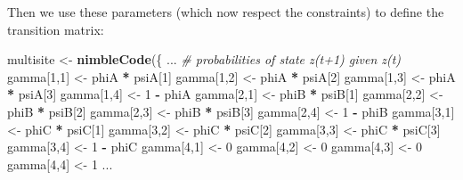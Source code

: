 \documentclass[
  12pt,
]{krantz}
\newenvironment{Shaded}{\begin{snugshade}}{\end{snugshade}}
\newcommand{\CommentTok}[1]{\textcolor[rgb]{0.56,0.35,0.01}{\textit{#1}}}
\newcommand{\DecValTok}[1]{\textcolor[rgb]{0.00,0.00,0.81}{#1}}
\newcommand{\FunctionTok}[1]{\textcolor[rgb]{0.13,0.29,0.53}{\textbf{#1}}}
\newcommand{\NormalTok}[1]{#1}
\newcommand{\OtherTok}[1]{\textcolor[rgb]{0.56,0.35,0.01}{#1}}
\newcommand{\SpecialCharTok}[1]{\textcolor[rgb]{0.81,0.36,0.00}{\textbf{#1}}}
\begin{document}
Then we use these parameters (which now respect the constraints) to define the transition matrix:

\begin{Shaded}
\begin{Highlighting}[]
\NormalTok{multisite }\OtherTok{\textless{}{-}} \FunctionTok{nimbleCode}\NormalTok{(\{}
\NormalTok{...}
  \CommentTok{\# probabilities of state z(t+1) given z(t)}
\NormalTok{  gamma[}\DecValTok{1}\NormalTok{,}\DecValTok{1}\NormalTok{] }\OtherTok{\textless{}{-}}\NormalTok{ phiA }\SpecialCharTok{*}\NormalTok{ psiA[}\DecValTok{1}\NormalTok{]}
\NormalTok{  gamma[}\DecValTok{1}\NormalTok{,}\DecValTok{2}\NormalTok{] }\OtherTok{\textless{}{-}}\NormalTok{ phiA }\SpecialCharTok{*}\NormalTok{ psiA[}\DecValTok{2}\NormalTok{]}
\NormalTok{  gamma[}\DecValTok{1}\NormalTok{,}\DecValTok{3}\NormalTok{] }\OtherTok{\textless{}{-}}\NormalTok{ phiA }\SpecialCharTok{*}\NormalTok{ psiA[}\DecValTok{3}\NormalTok{]}
\NormalTok{  gamma[}\DecValTok{1}\NormalTok{,}\DecValTok{4}\NormalTok{] }\OtherTok{\textless{}{-}} \DecValTok{1} \SpecialCharTok{{-}}\NormalTok{ phiA}
\NormalTok{  gamma[}\DecValTok{2}\NormalTok{,}\DecValTok{1}\NormalTok{] }\OtherTok{\textless{}{-}}\NormalTok{ phiB }\SpecialCharTok{*}\NormalTok{ psiB[}\DecValTok{1}\NormalTok{]}
\NormalTok{  gamma[}\DecValTok{2}\NormalTok{,}\DecValTok{2}\NormalTok{] }\OtherTok{\textless{}{-}}\NormalTok{ phiB }\SpecialCharTok{*}\NormalTok{ psiB[}\DecValTok{2}\NormalTok{]}
\NormalTok{  gamma[}\DecValTok{2}\NormalTok{,}\DecValTok{3}\NormalTok{] }\OtherTok{\textless{}{-}}\NormalTok{ phiB }\SpecialCharTok{*}\NormalTok{ psiB[}\DecValTok{3}\NormalTok{]}
\NormalTok{  gamma[}\DecValTok{2}\NormalTok{,}\DecValTok{4}\NormalTok{] }\OtherTok{\textless{}{-}} \DecValTok{1} \SpecialCharTok{{-}}\NormalTok{ phiB}
\NormalTok{  gamma[}\DecValTok{3}\NormalTok{,}\DecValTok{1}\NormalTok{] }\OtherTok{\textless{}{-}}\NormalTok{ phiC }\SpecialCharTok{*}\NormalTok{ psiC[}\DecValTok{1}\NormalTok{]}
\NormalTok{  gamma[}\DecValTok{3}\NormalTok{,}\DecValTok{2}\NormalTok{] }\OtherTok{\textless{}{-}}\NormalTok{ phiC }\SpecialCharTok{*}\NormalTok{ psiC[}\DecValTok{2}\NormalTok{]}
\NormalTok{  gamma[}\DecValTok{3}\NormalTok{,}\DecValTok{3}\NormalTok{] }\OtherTok{\textless{}{-}}\NormalTok{ phiC }\SpecialCharTok{*}\NormalTok{ psiC[}\DecValTok{3}\NormalTok{]}
\NormalTok{  gamma[}\DecValTok{3}\NormalTok{,}\DecValTok{4}\NormalTok{] }\OtherTok{\textless{}{-}} \DecValTok{1} \SpecialCharTok{{-}}\NormalTok{ phiC}
\NormalTok{  gamma[}\DecValTok{4}\NormalTok{,}\DecValTok{1}\NormalTok{] }\OtherTok{\textless{}{-}} \DecValTok{0}
\NormalTok{  gamma[}\DecValTok{4}\NormalTok{,}\DecValTok{2}\NormalTok{] }\OtherTok{\textless{}{-}} \DecValTok{0}
\NormalTok{  gamma[}\DecValTok{4}\NormalTok{,}\DecValTok{3}\NormalTok{] }\OtherTok{\textless{}{-}} \DecValTok{0}
\NormalTok{  gamma[}\DecValTok{4}\NormalTok{,}\DecValTok{4}\NormalTok{] }\OtherTok{\textless{}{-}} \DecValTok{1}
\NormalTok{...}
\end{Highlighting}
\end{Shaded}
\end{document}
